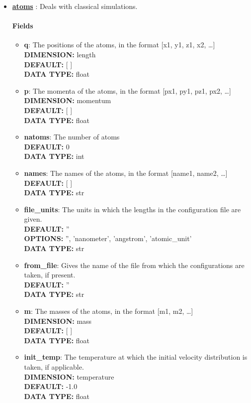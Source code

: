 \begin{itemize}
\item {\bf \hyperref[ATOMS]{atoms} }:
 Deals with classical simulations.
\paragraph{Fields}
 \begin{itemize}
\item {\bf q}:
 The positions of the atoms, in the format [x1, y1, z1, x2, \ldots  ]
{\\ \bf DIMENSION: }length
{\\ \bf DEFAULT: }[ ]
{\\ \bf DATA TYPE: }float
\item {\bf p}:
 The momenta of the atoms, in the format [px1, py1, pz1, px2, \ldots  ]
{\\ \bf DIMENSION: }momentum
{\\ \bf DEFAULT: }[ ]
{\\ \bf DATA TYPE: }float
\item {\bf natoms}:
 The number of atoms
{\\ \bf DEFAULT: }0
{\\ \bf DATA TYPE: }int
\item {\bf names}:
 The names of the atoms, in the format [name1, name2, \ldots  ]
{\\ \bf DEFAULT: }[ ]
{\\ \bf DATA TYPE: }str
\item {\bf file\_units}:
 The units in which the lengths in the configuration file are given.
{\\ \bf DEFAULT: }''
{\\ \bf OPTIONS: }'', 'nanometer', 'angstrom', 'atomic\_unit'
{\\ \bf DATA TYPE: }str
\item {\bf from\_file}:
 Gives the name of the file from which the configurations are taken, if present.
{\\ \bf DEFAULT: }''
{\\ \bf DATA TYPE: }str
\item {\bf m}:
 The masses of the atoms, in the format [m1, m2, \ldots  ]
{\\ \bf DIMENSION: }mass
{\\ \bf DEFAULT: }[ ]
{\\ \bf DATA TYPE: }float
\item {\bf init\_temp}:
 The temperature at which the initial velocity distribution is taken, if applicable.
{\\ \bf DIMENSION: }temperature
{\\ \bf DEFAULT: }-1.0
{\\ \bf DATA TYPE: }float
\end{itemize}
 

\end{itemize}

